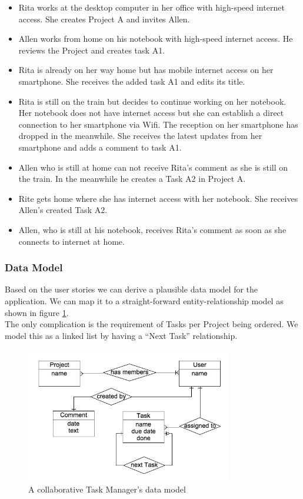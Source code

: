 \begin{itemize}
\item Rita works at the desktop computer in her office with high-speed internet access. She creates Project A and invites Allen.
\item Allen works from home on his notebook with high-speed internet access. He reviews the Project and creates task A1.
\item Rita is already on her way home but has mobile internet access on her smartphone. She receives the added task A1 and edits its title.
\item Rita is still on the train but decides to continue working on her notebook. Her notebook does not have internet access but she can establish a direct connection to her smartphone via Wifi. The reception on her smartphone has dropped in the meanwhile. She receives the latest updates from her smartphone and adds a comment to task A1.
\item Allen who is still at home can not receive Rita's comment as she is still on the train. In the meanwhile he creates a Task A2 in Project A.
\item Rite gets home where she has internet access with her notebook. She receives Allen's created Task A2.
\item Allen, who is still at his notebook, receives Rita's comment as soon as she connects to internet at home.
\end{itemize}

\subsubsection{Data Model}
Based on the user stories we can derive a plausible data model for the application. We can map it to a straight-forward entity-relationship model as shown in figure \ref{fig:tasks-data-model}.\\
The only complication is the requirement of Tasks per Project being ordered. We model this as a linked list by having a ``Next Task'' relationship.

\begin{figure}[tasks-data-model]
\centering
\includegraphics[width=0.8\textwidth]{img/tasks-schema}
\caption{A collaborative Task Manager's data model}
\label{fig:tasks-data-model}
\end{figure}


